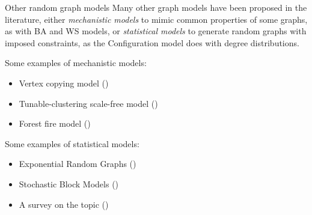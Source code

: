 \documentclass[a4paper,11pt]{book}
\begin{document}
\begin{textbox}{Other random graph models }
Many other graph models have been proposed in the literature, either \textit{mechanistic models} to mimic common properties of some graphs, as with BA and WS models, or \textit{statistical models} to generate random graphs with imposed constraints, as the Configuration model does with degree distributions. 

Some examples of mechanistic models:
\begin{itemize}
    \item Vertex copying model (\cite{kleinberg1999web})
    \item Tunable-clustering scale-free model (\cite{holme2002growing})
    \item Forest fire model (\cite{leskovec2005graphs})
\end{itemize}


Some examples of statistical models:
\begin{itemize}
    \item Exponential Random Graphs (\cite{robins2007introduction})
    \item Stochastic Block Models (\cite{peixoto2019bayesian})
    \item A survey on the topic (\cite{orbanz2014bayesian})
\end{itemize}
\end{textbox}














\end{document}
